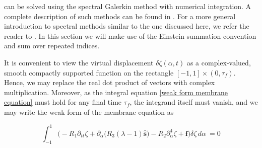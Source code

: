 \documentclass{article}[12pt]
\theoremstyle{Theorem}
\begin{document}
can be solved using the spectral Galerkin method with numerical integration. A complete description of such methods can be found in \cite{canuto2006spectral}. For a more general introduction to spectral methods similar to the one discussed here, we refer the reader to \cite{trefethen2000spectral}. In this section we will make use of the Einstein summation convention and sum over repeated indices.
\newline

It is convenient to view the virtual displacement $\delta\zeta(\alpha, t)$ as a complex-valued, smooth compactly supported function on the rectangle $[-1,1]\times(0,\tau_f)$. Hence, we may replace the real dot product of vectors with complex multiplication. Moreover, as the integral equation \eqref{weak form membrane equation} must hold for any final time $\tau_f$, the integrand itself must vanish, and we may write the weak form of the membrane equation as 

\begin{equation}
\int_{-1}^1\bigg(-R_1\partial_{tt}\zeta +\partial_\alpha\big(R_3 (\lambda-1)\hat{\boldsymbol{s}}\big) - R_2\partial_\alpha^4\zeta +\boldsymbol{f} \bigg)\delta\zeta\,d\alpha\ = 0
    \label{weak form of the membrane equation appendix}
\end{equation}
\end{document}
